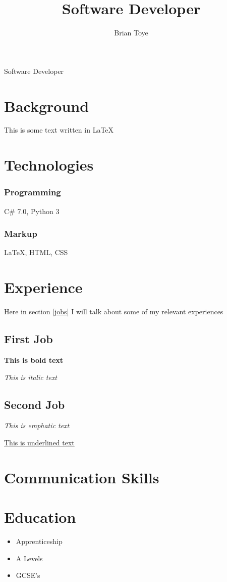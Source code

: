 \documentclass{article}
\author{Brian Toye}
\title{Software Developer}
\renewcommand{\maketitle}{
\begin{center}
{\huge\bfseries
\theauthor}

\vspace{.25em}

Software Developer
\end{center}
}
\begin{document}
\maketitle

\section{Background}

This is some text written in {\LaTeX}

\section{Technologies}

\subsubsection{Programming}
C\# 7.0, Python 3

\subsubsection{Markup}
{\LaTeX}, HTML, CSS

\section{Experience\label{jobs}}

Here in section \ref{jobs} I will talk about some of my relevant experiences

\subsection{First Job}

\textbf {This is bold text}

\textit {This is italic text}
\subsection{Second Job}

\emph{This is emphatic text}

\underline{This is underlined text}

\section{Communication Skills}

\section{Education}

\begin{itemize}
\item Apprenticeship
\item A Levels
\item GCSE's
\end{itemize}
\end{document}
